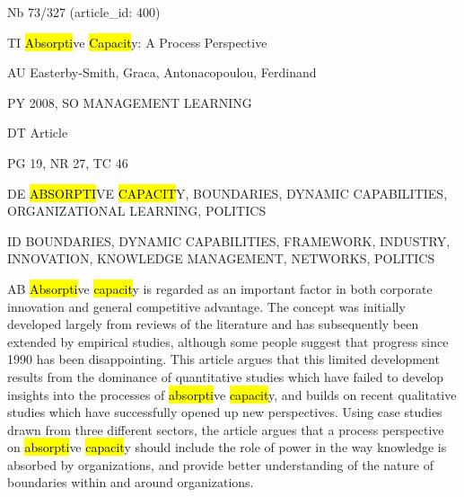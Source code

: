 \documentclass[a4paper]{article}
\begin{document}
\vspace*{-2cm}
Nb \tabto{0cm}73/327 (article\_id: 400)\par
TI \tabto{0cm}\hl{Absorpti}ve \hl{Capacit}y: A Process Perspective\par
AU \tabto{0cm}Easterby-Smith, Graca, Antonacopoulou, Ferdinand\par
PY \tabto{0cm}2008, SO MANAGEMENT LEARNING\par
DT \tabto{0cm}Article\par
PG \tabto{0cm}19, NR 27, TC 46\par
DE \tabto{0cm}\hl{ABSORPTI}VE \hl{CAPACIT}Y, BOUNDARIES, DYNAMIC CAPABILITIES, ORGANIZATIONAL LEARNING, POLITICS\par
ID \tabto{0cm}BOUNDARIES, DYNAMIC CAPABILITIES, FRAMEWORK, INDUSTRY, INNOVATION, KNOWLEDGE MANAGEMENT, NETWORKS, POLITICS\par
AB \tabto{0cm}\hl{Absorpti}ve \hl{capacit}y is regarded as an important factor in both corporate innovation and general competitive advantage. The concept was initially developed largely from reviews of the literature and has subsequently been extended by empirical studies, although some people suggest that progress since 1990 has been disappointing. This article argues that this limited development results from the dominance of quantitative studies which have failed to develop insights into the processes of \hl{absorpti}ve \hl{capacit}y, and builds on recent qualitative studies which have successfully opened up new perspectives. Using case studies drawn from three different sectors, the article argues that a process perspective on \hl{absorpti}ve \hl{capacit}y should include the role of power in the way knowledge is absorbed by organizations, and provide better understanding of the nature of boundaries within and around organizations.\par
\clearpage
\end{document}
